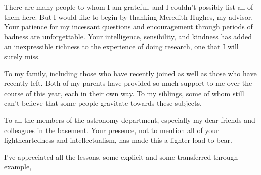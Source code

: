 There are many people to whom I am grateful, and I couldn't possibly list all of them here.
But I would like to begin by thanking Meredith Hughes, my advisor.
Your patience for my incessant questions and encouragement through periods of badness are unforgettable.
Your intelligence, sensibility, and kindness has added an inexpressible richness to the experience of doing research, one that I will surely miss.

To my family, including those who have recently joined as well as those who have recently left.
Both of my parents have provided so much support to me over the course of this year, each in their own way.
To my siblings, some of whom still can't believe that some people gravitate towards these subjects.

To all the members of the astronomy department, especially my dear friends and colleagues in the basement.
Your presence, not to mention all of your lightheartedness and intellectualism, has made this a lighter load to bear.

I've appreciated all the lessons, some explicit and some transferred through example,
